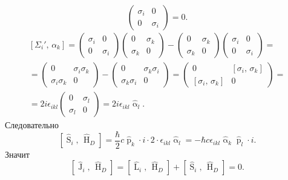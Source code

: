 \documentclass[a4paper]{article}
\begin{document}
\begin{sol}
\begin{enumerate}
\[	\begin{pmatrix} \sigma_i & 0\\ 0 & \sigma_i \end{pmatrix} =0
.\] 
\begin{multline*}
\left[ \Sigma_i',\,\alpha_k \right] =
\begin{pmatrix}\sigma_i & 0\\ 0 & \sigma_i  \end{pmatrix} 
\begin{pmatrix} 0 & \sigma_k\\ \sigma_k &0 \end{pmatrix} -
\begin{pmatrix} 0 & \sigma_k \\ \sigma_k & 0 \end{pmatrix} 
\begin{pmatrix} \sigma_i & 0 \\ 0&\sigma_i \end{pmatrix} =\\=
\begin{pmatrix} 0 & \sigma_i \sigma_k \\
\sigma_i \sigma_k &0\end{pmatrix} -
	\begin{pmatrix} 0 & \sigma_k \sigma_i\\
	\sigma_k \sigma_i &0\end{pmatrix} =
		\begin{pmatrix} 0 & \left[ \sigma_i,\,\sigma_k \right] \\ \left[ \sigma_i,\,\sigma_k \right] &0 \end{pmatrix} =\\=
		2i \epsilon _{ikl} \begin{pmatrix} 
		0 & \sigma_l \\ \sigma_l &0\end{pmatrix} 
		= 2i \epsilon _{ikl} \widehat{\operatorname{\alpha}}_l
.\end{multline*} 
Следовательно
\[
\left[ \widehat{\operatorname{S}}_i,\,\widehat{\operatorname{H}}_D \right] =
\frac{\hbar }{2}c \widehat{\operatorname{p}}_k \cdot i
\cdot 2 \cdot  \epsilon _{ikl} \widehat{\operatorname{\alpha}}_l=
-\hbar c \epsilon _{ikl} \widehat{\operatorname{\alpha}}_{k}
\widehat{\operatorname{p}}_l \cdot i
.\] 
Значит
\[
\left[ \widehat{\operatorname{J}}_i,\,\widehat{\operatorname{H}}_D \right] =
\left[ \widehat{\operatorname{L}}_i,\,\widehat{\operatorname{H}}_D \right] +
\left[ \widehat{\operatorname{S}}_i,\,\widehat{\operatorname{H}}_D \right] =0
.\] 
\end{enumerate}
\end{sol}
\end{document}
